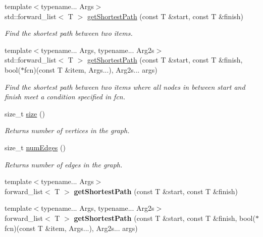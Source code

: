 \begin{DoxyCompactItemize}
{\footnotesize template$<$typename... Args$>$ }\\std\+::forward\+\_\+list$<$ T $>$ \hyperlink{class_graph_a8d04a41dc37e5d4604f8ae546fbdfca9}{get\+Shortest\+Path} (const T \&start, const T \&finish)
\begin{DoxyCompactList}\small\item\em Find the shortest path between two items. \end{DoxyCompactList}\item 
{\footnotesize template$<$typename... Args, typename... Arg2s$>$ }\\std\+::forward\+\_\+list$<$ T $>$ \hyperlink{class_graph_a8b2f84e77b6fffbea0c4581524c8d04d}{get\+Shortest\+Path} (const T \&start, const T \&finish, bool($\ast$fcn)(const T \&item, Args...), Arg2s... args)
\begin{DoxyCompactList}\small\item\em Find the shortest path between two items where all nodes in between start and finish meet a condition specified in fcn. \end{DoxyCompactList}\item 
size\+\_\+t \hyperlink{class_graph_a98ac5dfc305ed0e31b6bb160503151ba}{size} ()
\begin{DoxyCompactList}\small\item\em Returns number of vertices in the graph. \end{DoxyCompactList}\item 
size\+\_\+t \hyperlink{class_graph_a5548064ddb3dfa56bb32347ee47f98dd}{num\+Edges} ()
\begin{DoxyCompactList}\small\item\em Returns number of edges in the graph. \end{DoxyCompactList}\item 
\mbox{\label{class_graph_ab7e790b5a83e2cf795adb57ebb92ed96}} 
{\footnotesize template$<$typename... Args$>$ }\\forward\+\_\+list$<$ T $>$ {\bfseries get\+Shortest\+Path} (const T \&start, const T \&finish)
\item 
\mbox{\label{class_graph_acd1c78e2297eb288b0ee884fde4ddfe9}} 
{\footnotesize template$<$typename... Args, typename... Arg2s$>$ }\\forward\+\_\+list$<$ T $>$ {\bfseries get\+Shortest\+Path} (const T \&start, const T \&finish, bool($\ast$fcn)(const T \&item, Args...), Arg2s... args)
\end{DoxyCompactItemize}
